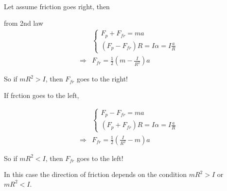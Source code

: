 \documentclass{article}
\begin{document}
\begin{multicols}{2}%

Let assume friction goes right, then



from 2nd law%
\begin{eqnarray*}
&&\left\{ 
\begin{array}{c}
F_{p}+F_{fr}=ma \\ 
\left( F_{p}-F_{fr}\right) R=I\alpha =I\frac{a}{R}%
\end{array}%
\right. \\
&\Rightarrow &F_{fr}=\frac{1}{2}\left( m-\frac{I}{R^{2}}\right) a
\end{eqnarray*}

So if $mR^{2}>I$, then $F_{fr}$ goes to the right!

\bigskip

If frction goes to the left,



\begin{eqnarray*}
&&\left\{ 
\begin{array}{c}
F_{p}-F_{fr}=ma \\ 
\left( F_{p}+F_{fr}\right) R=I\alpha =I\frac{a}{R}%
\end{array}%
\right. \\
&\Rightarrow &F_{fr}=\frac{1}{2}\left( \frac{I}{R^{2}}-m\right) a
\end{eqnarray*}

So if $mR^{2}<I$, then $F_{fr}$ goes to the left!

\bigskip

\end{multicols}%

In this case the direction of friction depends on the condition $mR^{2}>I$
or $mR^{2}<I$.
\end{document}
